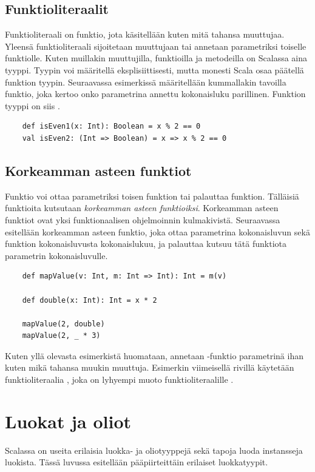 \subsection{Funktioliteraalit}
Funktioliteraali on funktio, jota käsitellään kuten mitä tahansa muuttujaa. Yleensä funktioliteraali sijoitetaan muuttujaan tai annetaan parametriksi toiselle funktiolle. Kuten muillakin muuttujilla, funktioilla ja metodeilla on Scalassa aina tyyppi. Tyypin voi määritellä eksplisiittisesti, mutta monesti Scala osaa päätellä funktion tyypin.
Seuraavassa esimerkissä määritellään kummallakin tavoilla funktio, joka kertoo onko parametrina annettu kokonaisluku parillinen. Funktion tyyppi on siis .
\cite[Luku 8]{prorgrammingInScala3rd}
\begin{lstlisting}
    def isEven1(x: Int): Boolean = x % 2 == 0
    val isEven2: (Int => Boolean) = x => x % 2 == 0
\end{lstlisting}

\subsection{Korkeamman asteen funktiot}
Funktio voi ottaa parametriksi toisen funktion tai palauttaa funktion. Tälläisiä funktioita kutsutaan \textit{korkeamman asteen funktioiksi}. Korkeamman asteen funktiot ovat yksi funktionaalisen ohjelmoinnin kulmakivistä. Seuraavassa esitellään korkeamman asteen funktio, joka ottaa parametrina kokonaisluvun sekä funktion kokonaisluvusta kokonaislukuu, ja palauttaa kutsuu tätä funktiota parametrin kokonaisluvulle.
\begin{lstlisting}
    def mapValue(v: Int, m: Int => Int): Int = m(v)
    
    def double(x: Int): Int = x * 2
    
    mapValue(2, double)
    mapValue(2, _ * 3)
\end{lstlisting}
Kuten yllä olevasta esimerkistä huomataan, annetaan -funktio parametrinä ihan kuten mikä tahansa muukin muuttuja. Esimerkin viimeisellä rivillä käytetään funktioliteraalia , joka on lyhyempi muoto funktioliteraalille .
\cite[Luku 12]{scalaForTheImpatient}


\section{Luokat ja oliot} \label{LuokatJaOliot}
Scalassa on useita erilaisia luokka- ja oliotyyppejä sekä tapoja luoda instansseja luokista. Tässä luvussa esitellään pääpiirteittäin erilaiset luokkatyypit.

